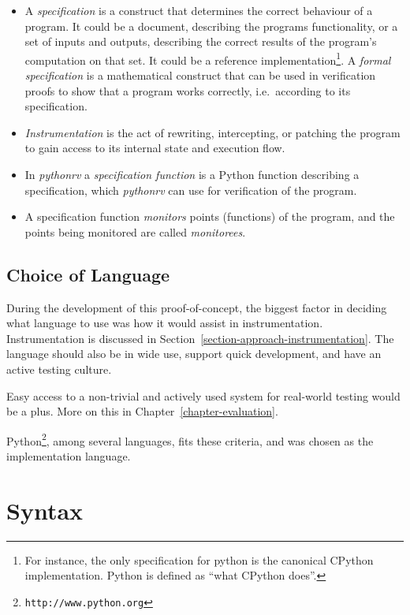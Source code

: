 \documentclass[a4paper,11pt]{kth-mag}
\begin{document}
\begin{itemize}
  \item A \textit{specification} is a construct that determines the correct
    behaviour of a program. It could be a document, describing the programs
		functionality, or a set of inputs and outputs, describing the correct
		results of the program's computation on that set. It could be a reference
		implementation\footnote{For instance, the only specification for python is
		the canonical CPython implementation. Python is defined as ``what CPython
		does''.}. A \textit{formal specification} is a mathematical construct that
		can be used in verification proofs to show that a program works correctly,
		i.e.\ according to its specification.

	\item \textit{Instrumentation} is the act of rewriting, intercepting, or
		patching the program to gain access to its internal state and execution
		flow.

	\item In \textit{pythonrv} a \textit{specification function} is a Python
		function describing a specification, which \textit{pythonrv} can use for
		verification of the program.

	\item A specification function
		\textit{monitors} points (functions) of the program, and the points being
		monitored are called \textit{monitorees}.
\end{itemize}


\subsection{Choice of Language}

During the development of this proof-of-concept, the biggest factor in deciding
what language to use was how it would assist in instrumentation.
Instrumentation is discussed in Section~\ref{section-approach-instrumentation}.
The language should also be in wide use, support quick development, and have an
active testing culture.

Easy access to a non-trivial and actively used system for real-world testing
would be a plus. More on this in Chapter~\ref{chapter-evaluation}.

Python\footnote{\texttt{http://www.python.org}}, among several languages, fits
these criteria, and was chosen as the implementation language.


\section{Syntax} \label{section-approach-syntax}
\end{document}
